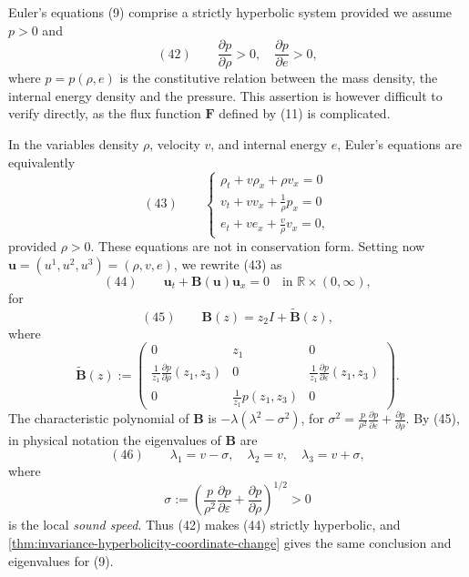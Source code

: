 \begin{example}
\label{ex:euler-equations-strict-hyperbolicity}
Euler's equations (9) comprise a strictly hyperbolic system provided we assume $p>0$ and
$$(42) \qquad \frac{\partial p}{\partial\rho}>0, \quad \frac{\partial p}{\partial e}>0,$$
where $p=p(\rho,e)$ is the constitutive relation between the mass density, the internal energy density and the pressure. This assertion is however difficult to verify directly, as the flux function $\mathbf{F}$ defined by (11) is complicated.

In the variables density $\rho$, velocity $v$, and internal energy $e$, Euler's equations are equivalently
$$(43) \qquad \begin{cases} \rho_t + v\rho_x + \rho v_x = 0 \\ v_t + vv_x + \frac{1}{\rho}p_x = 0 \\ e_t + ve_x + \frac{v}{\rho}v_x = 0, \end{cases}$$
provided $\rho>0$. These equations are not in conservation form. Setting now $\mathbf{u}=(u^1,u^2,u^3)=(\rho,v,e)$, we rewrite (43) as
$$(44) \qquad \mathbf{u}_t + \mathbf{B}(\mathbf{u})\mathbf{u}_x = 0 \quad \text{in } \mathbb{R}\times(0,\infty),$$
for
$$(45) \qquad \mathbf{B}(z) = z_2 I + \tilde{\mathbf{B}}(z),$$
where
$$\tilde{\mathbf{B}}(z) := \begin{pmatrix} 0 & z_1 & 0 \\ \frac{1}{z_1}\frac{\partial p}{\partial\rho}(z_1,z_3) & 0 & \frac{1}{z_1}\frac{\partial p}{\partial\varepsilon}(z_1,z_3) \\ 0 & \frac{1}{z_1}p(z_1,z_3) & 0 \end{pmatrix}.$$
The characteristic polynomial of $\mathbf{B}$ is $-\lambda(\lambda^2-\sigma^2)$, for $\sigma^2 = \frac{p}{\rho^2}\frac{\partial p}{\partial\varepsilon} + \frac{\partial p}{\partial\rho}$. By (45), in physical notation the eigenvalues of $\mathbf B$ are
$$(46) \qquad \lambda_1 = v-\sigma, \quad \lambda_2 = v, \quad \lambda_3 = v+\sigma,$$
where
$$\sigma := \left(\frac{p}{\rho^2}\frac{\partial p}{\partial\varepsilon} + \frac{\partial p}{\partial\rho}\right)^{1/2} > 0$$
is the local \textit{sound speed}. Thus (42) makes (44) strictly hyperbolic, and \cref{thm:invariance-hyperbolicity-coordinate-change} gives the same conclusion and eigenvalues for (9).
\end{example}

